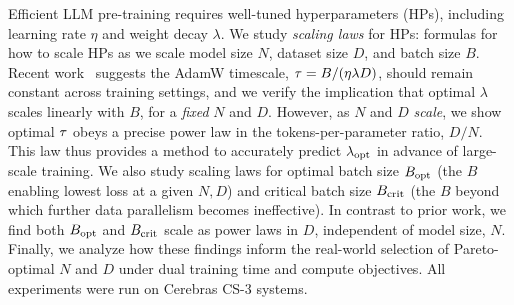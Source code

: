 Efficient LLM pre-training requires well-tuned hyperparameters (HPs),
including learning rate $\eta$ and weight decay $\lambda$.
%
We study \emph{scaling laws} for HPs: formulas for how to scale HPs as
we scale model size $N$, dataset size $D$, and batch size $B$.
%
Recent work~\citep{wang2024how} suggests the AdamW timescale, $\tau =
B/(\eta\lambda D)$, should remain constant across training settings,
and we verify the implication that optimal $\lambda$ scales linearly
with $B$, for a \emph{fixed} $N$ and $D$.  However, as $N$ and
$D$ \emph{scale}, we show optimal $\tau$ obeys a precise power law
in the tokens-per-parameter ratio, $D/N$.  This law thus provides a
method to accurately predict $\lambda_{\text{opt}}$ in advance of large-scale
training.
%
We also study scaling laws for optimal batch size $B_{\text{opt}}$ (the $B$
enabling lowest loss at a given $N, D$) and critical batch size $B_{\text{crit}}$ (the
$B$ beyond which further data parallelism becomes ineffective).
%
In contrast to prior work, we find both $B_{\text{opt}}$ and $B_{\text{crit}}$ scale as
power laws in $D$, independent of model size, $N$.
%
Finally, we analyze how these findings inform the real-world selection
of Pareto-optimal $N$ and $D$ under dual training time and compute
objectives.
%
All experiments were run on Cerebras CS-3 systems.
